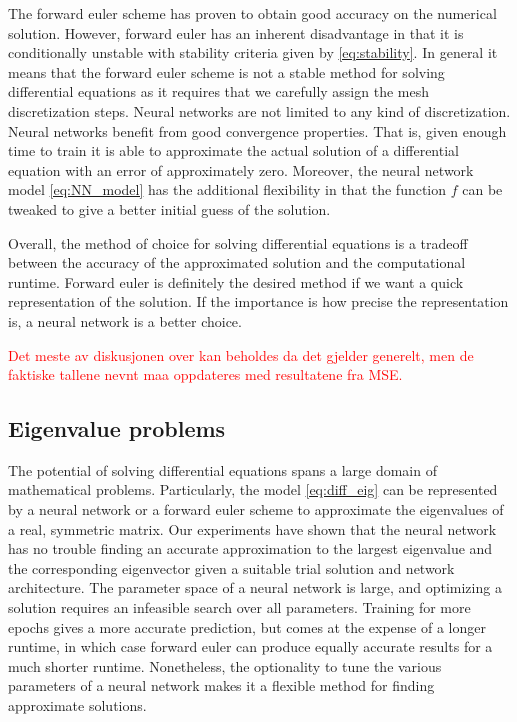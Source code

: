 \documentclass[12pt]{extarticle}
\begin{document}
\par The forward euler scheme has proven to obtain good accuracy on the numerical solution. However, forward euler has an inherent disadvantage in that it is conditionally unstable with stability criteria given by \eqref{eq:stability}. In general it means that the forward euler scheme is not a stable method for solving differential equations as it requires that we carefully assign the mesh discretization steps. Neural networks are not limited to any kind of discretization. Neural networks benefit from good convergence properties. That is, given enough time to train it is able to approximate the actual solution of a differential equation with an error of approximately zero. Moreover, the neural network model \eqref{eq:NN_model} has the additional flexibility in that the function $f$ can be tweaked to give a better initial guess of the solution. 
\par Overall, the method of choice for solving differential equations is a tradeoff between the accuracy of the approximated solution and the computational runtime. Forward euler is definitely the desired method if we want a quick representation of the solution. If the importance is how precise the representation is, a neural network is a better choice.

\textcolor{red}{Det meste av diskusjonen over kan beholdes da det gjelder generelt, men de faktiske tallene nevnt maa oppdateres med resultatene fra MSE.}


\subsection{Eigenvalue problems}
The potential of solving differential equations spans a large domain of mathematical problems. Particularly, the model \eqref{eq:diff_eig} can be represented by a neural network or a forward euler scheme to approximate the eigenvalues of a real, symmetric matrix. Our experiments have shown that the neural network has no trouble finding an accurate approximation to the largest eigenvalue and the corresponding eigenvector given a suitable trial solution and network architecture. The parameter space of a neural network is large, and optimizing a solution requires an infeasible search over all parameters. Training for more epochs gives a more accurate prediction, but comes at the expense of a longer runtime, in which case forward euler can produce equally accurate results for a much shorter runtime. Nonetheless, the optionality to tune the various parameters of a neural network makes it a flexible method for finding approximate solutions.
\end{document}
